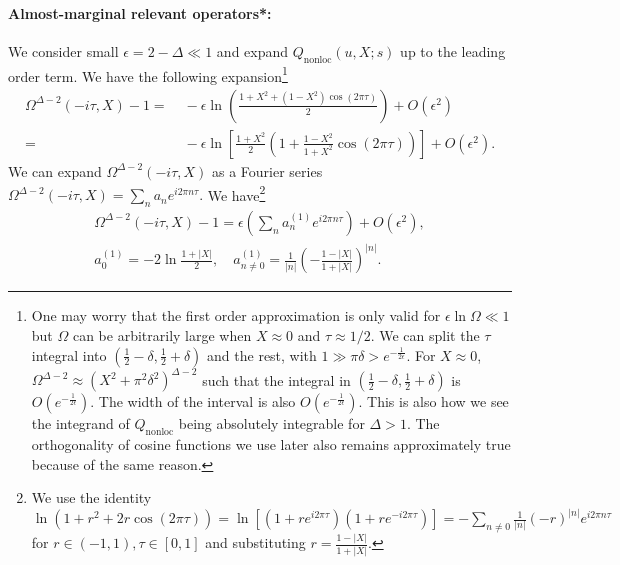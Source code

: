 \documentclass[a4paper,11pt]{article}
\theoremstyle{definition}
\theoremstyle{remark}
\begin{document}
\paragraph{Almost-marginal relevant operators*:} 
We consider small $\epsilon =2-\Delta\ll 1$ and expand $Q_{\text{nonloc}}(u,X;s)$ up to the leading order term. We have the following expansion\footnote{One may worry that the first order approximation is only valid for $\epsilon \ln\Omega \ll 1$ but $\Omega$ can be arbitrarily large when $X\approx 0$ and $\tau \approx 1/2$. We can split the $\tau$ integral into $(\frac{1}{2}-\delta, \frac{1}{2}+\delta)$ and the rest, with $1 \gg \pi\delta > e^{-\frac{1}{2\epsilon}}$. For $X\approx0$, $\Omega^{\Delta-2} \approx (X^2+\pi^2\delta^2)^{\Delta-2}$ such that the integral in $(\frac{1}{2}-\delta, \frac{1}{2}+\delta)$ is $O(e^{-\frac{1}{2\epsilon}})$. The width of the interval is also $O(e^{-\frac{1}{2\epsilon}})$. This is also how we see the integrand of $Q_{\text{nonloc}}$ being absolutely integrable for $\Delta > 1$. The orthogonality of cosine functions we use later also remains approximately true because of the same reason.}
\begin{align}
    \Omega^{\Delta-2}(-i\tau,X) - 1 =&\; - \epsilon \ln \left(\frac{1+X^2+(1-X^2)\cos(2\pi \tau)}{2}\right) + O(\epsilon^2)\\
    =&\; - \epsilon \ln \left[\frac{1+X^2}{2}\left(1+\frac{1-X^2}{1+X^2}\cos(2\pi \tau)\right)\right] + O(\epsilon^2). %
\end{align}
We can expand $\Omega^{\Delta-2}(-i\tau,X)$ as a Fourier series $\Omega^{\Delta-2}(-i\tau,X) = \sum_{n} a_n e^{i2\pi n \tau}.$ We have\footnote{We use the identity $\ln(1+r^2 + 2r\cos(2\pi\tau)) = \ln\left[(1+re^{i2\pi\tau})(1+re^{-i2\pi\tau})\right] = -\sum_{n \neq 0} \frac{1}{|n|}(-r)^{|n|}e^{i2\pi n\tau}$ for $r\in (-1,1), \tau\in[0,1]$ and substituting $r = \frac{1-|X|}{1+|X|}$.}
\begin{gather}
    \Omega^{\Delta-2}(-i\tau,X) - 1 = \epsilon \left(\sum_{n} a_n^{(1)}e^{i2 \pi n \tau} \right) + O(\epsilon^2),\\
    a_0^{(1)} =  -2\ln \frac{1+|X|}{2}, \quad a_{n \neq 0}^{(1)} = \frac{1}{|n|} \left(-\frac{1-|X|}{1+|X|}\right)^{|n|}.
\end{gather}
\end{document}
